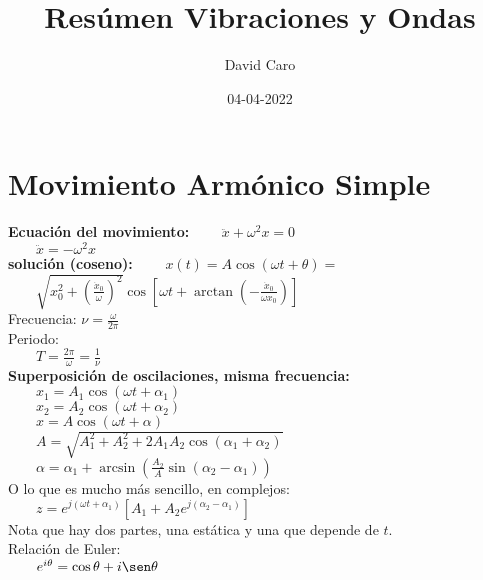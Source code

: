 \documentclass[a4paper,landscape,10pt]{cheatsheet}
\title{Resúmen Vibraciones y Ondas}
\author{David Caro}
\date{04-04-2022}
\begin{document}
\maketitle

\section{Movimiento Armónico Simple}
\textbf{Ecuación del movimiento:}
$\qquad \ddot{x}+\omega^2x=0$\\
$\qquad \ddot{x}=-\omega^2x$\\

\textbf{solución (coseno):}
$\qquad x(t)=A\cos(\omega t+\theta)=$\\
$\qquad \sqrt{x_0^2+\left(\frac{\dot x_0}{\omega}\right)^2}\cos\left[\omega t + \arctan\left(-\frac{\dot x_0}{\omega x_0}\right)\right]$\\
Frecuencia: $\nu=\frac{\omega}{2\pi}$\\
Periodo: \\
$\qquad T=\frac{2\pi}{\omega}=\frac{1}{\nu}$\\

\textbf{Superposición de oscilaciones, misma frecuencia:}\\
$\qquad x_1=A_1\cos\left(\omega t+\alpha_1\right)$\\
$\qquad x_2=A_2\cos\left(\omega t+\alpha_2\right)$\\
$\qquad x=A\cos\left(\omega t+\alpha\right)$\\
$\qquad A=\sqrt{A_1^2+A_2^2+2A_{1}A_2\cos\left(\alpha_1+\alpha_2\right)}$\\
$\qquad \alpha=\alpha_1+\arcsin\left(\frac{A_2}{A}\sin\left(\alpha_2-\alpha_1\right)\right)$\\
O lo que es mucho más sencillo, en complejos:\\
$\qquad z=e^{j\left(\omega t+\alpha_1\right)}\left[A_1+A_2e^{j\left(\alpha_2-\alpha_1\right)}\right]$\\
Nota que hay dos partes, una estática y una que depende de $t$.\\
Relación de Euler:\\
$\qquad e^{i\theta}=\cos\theta+i\sen\theta$\\
\end{document}
